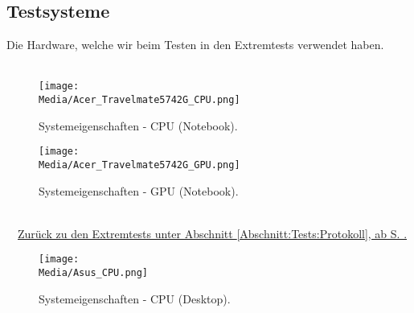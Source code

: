 %



\clearpage



	
\subsection*{Testsysteme}

Die Hardware, welche wir beim Testen in den Extremtests verwendet haben.\\

~\\



\label{Anhang:Testsysteme:Notebook}



\begin{figure}[ht!]

	\centering
	\label{Anhang:Medien:Acer_Travelmate5742G_CPU}
	
	\texttt{[image: \\Media/Acer\_Travelmate5742G\_CPU.png]}
	
	\caption{Systemeigenschaften - CPU (Notebook).}

\end{figure}

\begin{figure}[ht!]

	\centering
	\label{Anhang:Medien:Acer_Travelmate5742G_GPU}
	
	\texttt{[image: \\Media/Acer\_Travelmate5742G\_GPU.png]}
	
	\caption{Systemeigenschaften - GPU (Notebook).}

\end{figure}


~\\~\mousecursor~\hyperref[Abschnitt:Tests:Protokoll:Extrem:Knoten_Erzeugen:Notebook]{Zurück zu den Extremtests unter Abschnitt \ref{Abschnitt:Tests:Protokoll}, ab S. \pageref{Abschnitt:Tests:Protokoll:Extrem:Knoten_Erzeugen:Notebook}.}


\clearpage



\label{Anhang:Testsysteme:Desktop}



\begin{figure}[ht!]

	\centering
	\label{Anhang:Medien:Asus_CPU}
	
	\texttt{[image: \\Media/Asus\_CPU.png]}
	
	\caption{Systemeigenschaften - CPU (Desktop).}

\end{figure}

